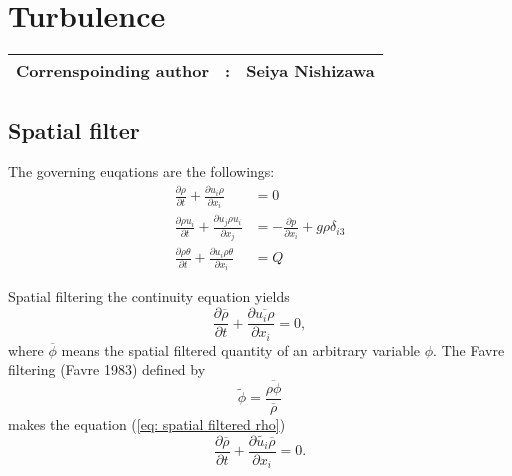 %

\section{Turbulence}
{\bf \Large 
\begin{tabular}{ccc}
\hline
  Correnspoinding author & : & Seiya Nishizawa\\
\hline
\end{tabular}
}

\def\half{\frac{1}{2}}

\subsection{Spatial filter}

The governing euqations are the followings:
\begin{align}
  \frac{\partial\rho}{\partial t} + \frac{\partial u_i \rho}{\partial x_i} 
  &= 0 \\
  \frac{\partial\rho u_i}{\partial t}
  + \frac{\partial u_j \rho u_i}{\partial x_j}
  &= -\frac{\partial p}{\partial x_i} + g \rho \delta_{i3} \\
  \frac{\partial\rho \theta}{\partial t}
  + \frac{\partial u_i \rho \theta}{\partial x_i}
  &= Q
\end{align}

Spatial filtering the continuity equation yields
\begin{equation}
  \frac{\partial \overline{\rho}}{\partial t} + \frac{\partial \overline{u_i \rho}}{\partial x_i} = 0, \label{eq: spatial filtered rho}
\end{equation}
where $\overline{\phi}$ means the spatial filtered quantity of an arbitrary variable $\phi$.
The Favre filtering (Favre 1983) defined by
\begin{equation}
  \widetilde{\phi} = \frac{\overline{\rho \phi}}{\overline{\rho}}
\end{equation}
makes the equation (\ref{eq: spatial filtered rho})
\begin{equation}
  \frac{\partial \overline{\rho}}{\partial t} + \frac{\partial \widetilde{u_i}\overline{\rho}}{\partial x_i} = 0.
\end{equation}


